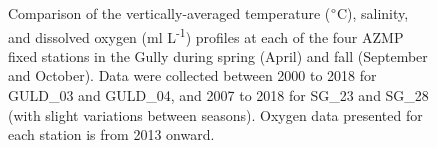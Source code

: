 \documentclass[12pt]{article}\usepackage[]{graphicx}\usepackage[]{color}
\begin{document}
\begin{landscapepage}
\begin{figure}[htb]

{\centering {} 

}

\caption{Comparison of the vertically-averaged temperature (\(\degree\)C), salinity, and dissolved oxygen (ml L\textsuperscript{-1}) profiles at each of the four AZMP fixed stations in the Gully during spring (April) and fall (September and October). Data were collected between 2000 to 2018 for GULD\_03 and GULD\_04, and 2007 to 2018 for SG\_23 and SG\_28 (with slight variations between seasons). Oxygen data presented for each station is from 2013 onward.}\label{fig:figure8}
\end{figure}
\end{landscapepage}
\clearpage
\end{document}

